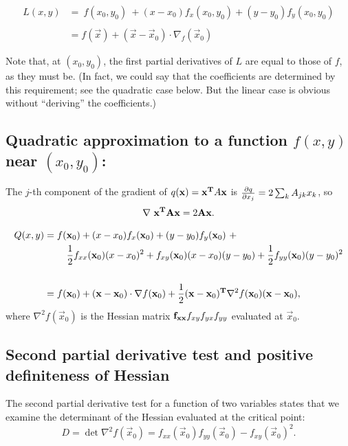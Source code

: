 \begin{align*}
L(x, y) &=
~
f(x_0, y_0) ~+
(x - x_0)f_x(x_0,y_0) +
(y - y_0)f_y(x_0,y_0)
\\\\
&= f(\vec x) + (\vec x - \vec x_0) \cdot \nabla_f(\vec x_0)
\end{align*}

Note that, at $(x_0, y_0)$, the first partial derivatives of $L$ are equal to
those of $f$, as they must be. (In fact, we could say that the coefficients are
determined by this requirement; see the quadratic case below. But the linear
case is obvious without ``deriving'' the coefficients.)


\subsection{Quadratic approximation to a function $f(x, y)$ near $(x_0, y_0)$:}

The $j$-th component of the gradient of $q(\mathbf x) = \mathbf x^{\mathbf{T}} A \mathbf x$ is
$\frac{\partial q}{\partial x_j} = 2\sum_k A_{jk}x_k$, so
\begin{align*}
  \nabla ~\mathbf x^{\mathbf{T}} \mathbf A \mathbf x = 2\mathbf A \mathbf x.
\end{align*}

\begin{align*}
Q(x, y) &=
f(\mathbf x_0) + (x - x_0)f_x(\mathbf x_0) +
(y - y_0)f_y(\mathbf x_0) ~+ \\
&~~~~~~~\frac{1}{2} f_{xx}(\mathbf x_0)(x - x_0)^2 +
f_{xy}(\mathbf x_0)(x - x_0)(y - y_0) +
\frac{1}{2} f_{yy}(\mathbf x_0)(y - y_0)^2 \\\\
&= f(\mathbf x_0) +
(\mathbf x - \mathbf x_0) \cdot \nabla f(\mathbf x_0) +
\frac{1}{2}(\mathbf x - \mathbf x_0)^{\mathbf{T}} \nabla^2 f(\mathbf x_0)(\mathbf x - \mathbf x_0),
\end{align*}
where $\nabla^2 f(\vec x_0)$ is the Hessian matrix $\mathbf{f_{xx}}{f_{xy}}
                                                        {f_{yx}}{f_{yy}}$ evaluated at $\vec x_0$.

\subsection{Second partial derivative test and positive definiteness of Hessian}

The second partial derivative test for a function of two variables states that
we examine the determinant of the Hessian evaluated at the critical point:
$$
D = \det \nabla^2 f(\vec x_0) = f_{xx}(\vec x_0)f_{yy}(\vec x_0) - f_{xy}(\vec x_0)^2.
$$


